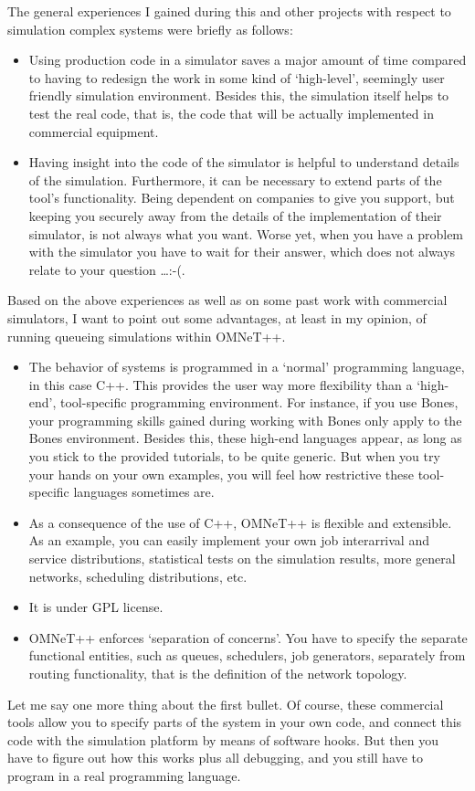 \documentclass[a4paper]{article}
\begin{document}
The general experiences I gained during this and other projects with
respect to simulation complex systems were briefly as follows:
\begin{itemize}
\item Using production code in a simulator saves a major amount of
  time compared to having to redesign the work in some kind of
  `high-level', seemingly user friendly simulation environment.
  Besides this, the simulation itself helps to test the real code,
  that is, the code that will be actually  implemented in commercial
  equipment.
\item Having insight into the code of the simulator is
  helpful to understand details of the simulation. Furthermore, it can
  be necessary to extend parts of the tool's functionality. Being
  dependent on companies to give you support, but keeping you securely
  away from the details of the implementation of their simulator, is
  not always what you want. Worse yet, when you have a problem with the
  simulator you have to wait for their answer, which does not always
  relate to your question \ldots :-(.
\end{itemize}
Based on the above experiences as well as on some past work with
commercial simulators, I want to point out some advantages, at least
in my opinion, of running queueing simulations within OMNeT++.
\begin{itemize}
\item The behavior of  systems is programmed in a `normal'
  programming language, in this case C++. This provides the user way
  more flexibility than a `high-end', tool-specific programming
  environment. For instance, if you use Bones, your programming skills
  gained during working with Bones only apply to the Bones
  environment. Besides this, these high-end languages appear, as long
  as you stick to the provided tutorials, to be quite generic. But
  when you try your hands on your own examples,  you will feel how
  restrictive these tool-specific languages sometimes  are.
\item As a consequence of the use of C++, OMNeT++ is flexible and
  extensible. As an example, you can easily implement your own job
  interarrival and service distributions, statistical tests on the
  simulation results, more general networks, scheduling distributions,
  etc.
\item It is under GPL license.
\item OMNeT++ enforces `separation of concerns'. You have to specify
  the separate functional entities, such as queues, schedulers, job
  generators, separately from routing functionality, that is the
  definition of the network topology.
\end{itemize}
Let me say one more thing about the first bullet. Of course, these
commercial tools allow you to specify parts of the system in your own
code, and connect this code with the simulation platform by means of
software hooks.  But then you have to figure out how this works plus
all debugging, and you still have to program in a real programming
language.
\end{document}
